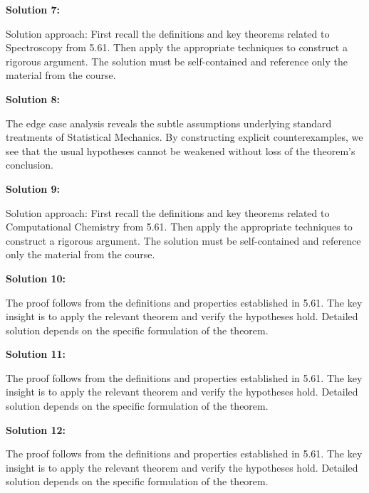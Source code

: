 \documentclass[12pt,a4paper]{exam}
\begin{document}
\vspace{0.5cm}

\textbf{Solution 7:}

Solution approach: First recall the definitions and key theorems related to Spectroscopy from 5.61. Then apply the appropriate techniques to construct a rigorous argument. The solution must be self-contained and reference only the material from the course.

\vspace{0.5cm}

\textbf{Solution 8:}

The edge case analysis reveals the subtle assumptions underlying standard treatments of Statistical Mechanics. By constructing explicit counterexamples, we see that the usual hypotheses cannot be weakened without loss of the theorem's conclusion.

\vspace{0.5cm}

\textbf{Solution 9:}

Solution approach: First recall the definitions and key theorems related to Computational Chemistry from 5.61. Then apply the appropriate techniques to construct a rigorous argument. The solution must be self-contained and reference only the material from the course.

\vspace{0.5cm}

\textbf{Solution 10:}

The proof follows from the definitions and properties established in 5.61. The key insight is to apply the relevant theorem and verify the hypotheses hold. Detailed solution depends on the specific formulation of the theorem.

\vspace{0.5cm}

\textbf{Solution 11:}

The proof follows from the definitions and properties established in 5.61. The key insight is to apply the relevant theorem and verify the hypotheses hold. Detailed solution depends on the specific formulation of the theorem.

\vspace{0.5cm}

\textbf{Solution 12:}

The proof follows from the definitions and properties established in 5.61. The key insight is to apply the relevant theorem and verify the hypotheses hold. Detailed solution depends on the specific formulation of the theorem.
\end{document}
